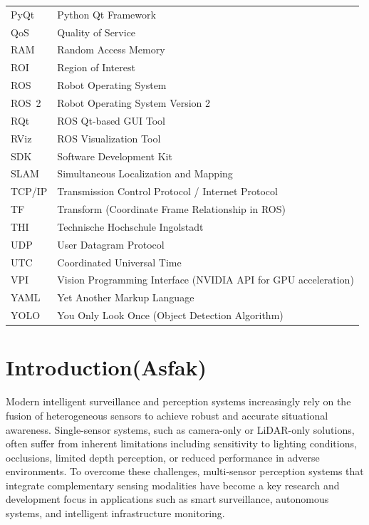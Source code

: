 \documentclass[12pt,a4paper]{report}
\begin{document}
\begin{longtable}{@{}p{}p{}@{}}
PyQt & Python Qt Framework \\
QoS & Quality of Service \\
RAM & Random Access Memory \\
ROI & Region of Interest \\
ROS & Robot Operating System \\
ROS~2 & Robot Operating System Version 2 \\
RQt & ROS Qt-based GUI Tool \\
RViz & ROS Visualization Tool \\
SDK & Software Development Kit \\
SLAM & Simultaneous Localization and Mapping \\
TCP/IP & Transmission Control Protocol / Internet Protocol \\
TF & Transform (Coordinate Frame Relationship in ROS) \\
THI & Technische Hochschule Ingolstadt \\
UDP & User Datagram Protocol \\
UTC & Coordinated Universal Time \\
VPI & Vision Programming Interface (NVIDIA API for GPU acceleration) \\
YAML & Yet Another Markup Language \\
YOLO & You Only Look Once (Object Detection Algorithm) \\
\bottomrule
\end{longtable}

\clearpage
{}

\chapter{Introduction(Asfak)}


Modern intelligent surveillance and perception systems increasingly rely on the fusion of heterogeneous sensors to achieve robust and accurate situational awareness. Single-sensor systems, such as camera-only or LiDAR-only solutions, often suffer from inherent limitations including sensitivity to lighting conditions, occlusions, limited depth perception, or reduced performance in adverse environments. To overcome these challenges, multi-sensor perception systems that integrate complementary sensing modalities have become a key research and development focus in applications such as smart surveillance, autonomous systems, and intelligent infrastructure monitoring. 
\end{document}
